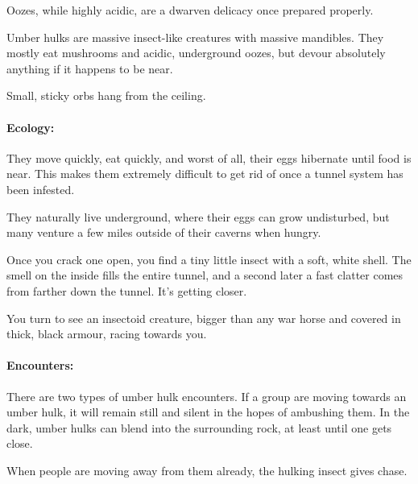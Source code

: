 \begin{multicols}{2}
Oozes, while highly acidic, are a dwarven delicacy once prepared properly.

\jelly

\label{umber_hulk}

Umber hulks are massive insect-like creatures with massive mandibles.
They mostly eat mushrooms and acidic, underground oozes, but devour absolutely anything if it happens to be near.

\begin{boxtext}

	Small, sticky orbs hang from the ceiling.

\end{boxtext}

\paragraph{Ecology:}
They move quickly, eat quickly, and worst of all, their eggs hibernate until food is near.
This makes them extremely difficult to get rid of once a tunnel system has been infested.

They naturally live underground, where their eggs can grow undisturbed, but many venture a few miles outside of their caverns when hungry.

\begin{boxtext}

	Once you crack one open, you find a tiny little insect with a soft, white shell.
	The smell on the inside fills the entire tunnel, and a second later a fast clatter comes from farther down the tunnel.
	It's getting closer.

	You turn to see an insectoid creature, bigger than any war horse and covered in thick, black armour, racing towards you.

\end{boxtext}

\paragraph{Encounters:}
There are two types of umber hulk encounters.
If a group are moving towards an umber hulk, it will remain still and silent in the hopes of ambushing them.
In the dark, umber hulks can blend into the surrounding rock, at least until one gets close.

When people are moving away from them already, the hulking insect gives chase.

\umberhulk

\label{watcher}


\end{multicols}
